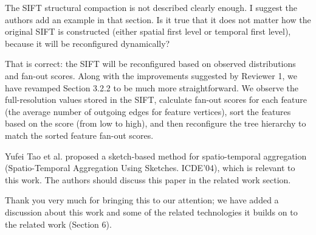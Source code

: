 \documentclass{article}
\begin{document}
The SIFT structural compaction is not described clearly enough. I
suggest the authors add an example in that section. Is it true that it
does not matter how the original SIFT is constructed (either spatial
first level or temporal first level), because it will be reconfigured
dynamically?

\begin{tcolorbox}
That is correct: the SIFT will be reconfigured based on observed distributions and fan-out scores. Along with the improvements suggested by Reviewer 1, we have revamped Section 3.2.2 to be much more straightforward. We observe the full-resolution values stored in the SIFT, calculate fan-out scores for each feature (the average number of outgoing edges for feature vertices), sort the features based on the score (from low to high), and then reconfigure the tree hierarchy to match the sorted feature fan-out scores.
\end{tcolorbox}

Yufei Tao et al. proposed a sketch-based method for spatio-temporal
aggregation (Spatio-Temporal Aggregation Using Sketches. ICDE'04), which
is relevant to this work. The authors should discuss this paper in the
related work section.

\begin{tcolorbox}
Thank you very much for bringing this to our attention; we have added a discussion about this work \cite{tao2004spatio} and some of the related technologies it builds on \cite{papadias2002indexing,flajolet1985probabilistic} to the related work (Section 6). 
\end{tcolorbox}



\end{document}
